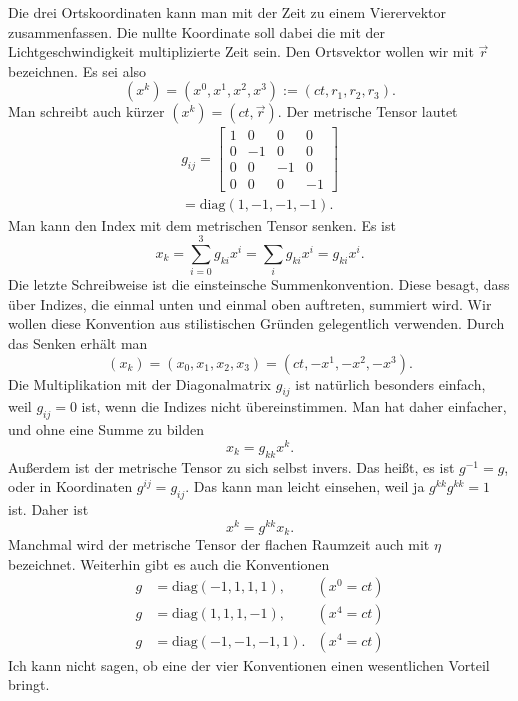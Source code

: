\documentclass[a4paper,11pt,fleqn,twocolumn,twoside]{scrartcl}
\begin{document}
Die drei Ortskoordinaten kann man mit der Zeit zu einem Vierervektor
zusammenfassen. Die nullte Koordinate soll dabei die mit der
Lichtgeschwindigkeit multiplizierte Zeit sein. Den Ortsvektor wollen
wir mit $\vec r$ bezeichnen. Es sei also
\[(x^k) = (x^0,x^1,x^2,x^3) := (ct,r_1,r_2,r_3).\]
Man schreibt auch kürzer $(x^k)=(ct,\vec r)$.
Der metrische Tensor lautet%
\begin{gather*}
g_{ij} = \begin{bmatrix}
1 & 0 & 0 & 0\\
0 & -1 & 0 & 0\\
0 & 0 & -1 & 0\\
0 & 0 & 0 & -1
\end{bmatrix}\\
= \mathrm{diag}(1,-1,-1,-1).
\end{gather*}
Man kann den Index mit dem metrischen Tensor senken. Es ist%
\[x_k = \sum_{i=0}^3 g_{ki}x^i = \sum_{i} g_{ki}x^i = g_{ki}x^i.\]
Die letzte Schreibweise ist die einsteinsche Summenkonvention. Diese
besagt, dass über Indizes, die einmal unten und einmal oben auftreten,
summiert wird. Wir wollen diese Konvention aus stilistischen Gründen
gelegentlich verwenden. Durch das Senken erhält man
\[(x_k) = (x_0,x_1,x_2,x_3) = (ct,-x^1,-x^2,-x^3).\]
Die Multiplikation mit der Diagonalmatrix $g_{ij}$ ist natürlich
besonders einfach, weil $g_{ij}=0$ ist, wenn die Indizes nicht
übereinstimmen. Man hat daher einfacher, und ohne eine Summe zu bilden%
\[x_k = g_{kk}x^k.\]
Außerdem ist der metrische Tensor zu sich selbst invers. Das heißt,
es ist $g^{-1}=g$, oder in Koordinaten $g^{ij}=g_{ij}$. Das kann man
leicht einsehen, weil ja $g^{kk}g^{kk}=1$ ist. Daher ist%
\[x^k = g^{kk}x_k.\]
Manchmal wird der metrische Tensor der flachen Raumzeit auch mit
$\eta$ bezeichnet. Weiterhin gibt es auch die Konventionen%
\begin{align*}
g&=\mathrm{diag}(-1,1,1,1),& (x^0=ct)\\
g&=\mathrm{diag}(1,1,1,-1),& (x^4=ct)\\
g&=\mathrm{diag}(-1,-1,-1,1).& (x^4=ct)
\end{align*}
Ich kann nicht sagen, ob eine der vier Konventionen einen
wesentlichen Vorteil bringt.
\end{document}
